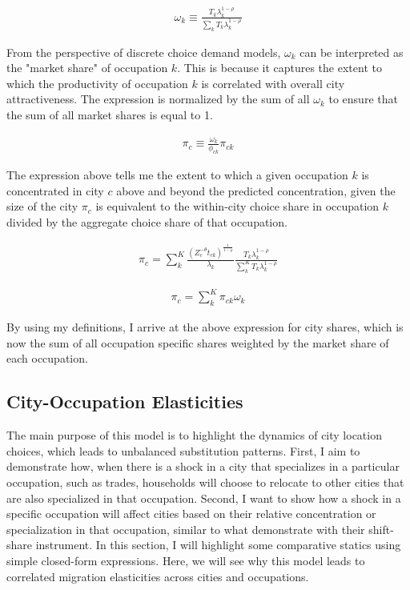 \documentclass[10pt]{article}
\begin{document}
\begin{align}
    \omega_k \equiv \frac{{T_{k}}\lambda_{k}^{1-\rho}}{\sum\limits_{k}{T_{k}}\lambda_{k}^{1-\rho}}
    \label{occupation_shares}
\end{align}

From the perspective of discrete choice demand models, $\omega_k$ can be interpreted as the "market share" of occupation $k$. This is because it captures the extent to which the productivity of occupation $k$ is correlated with overall city attractiveness. The expression is normalized by the sum of all $\omega_k$ to ensure that the sum of all market shares is equal to 1.

\begin{align}
    \pi_c \equiv \frac{\omega_k}{\phi_{ck}} \pi_{ck}
    \label{identity}
\end{align}

The expression above tells me the extent to which a given occupation $k$ is concentrated in city $c$ above and beyond the predicted concentration, given the size of the city $\pi_c$ is equivalent to the within-city choice share in occupation $k$ divided by the aggregate choice share of that occupation.

\begin{align*}
    \pi_{c} = \sum_{k}^{K} \frac{(Z_{c}^{-\theta} t_{ck})^{\frac{1}{1-\rho}}}{\lambda_k} \frac{T_k \lambda_{k}^{1 - \rho}}{\sum \limits_{k}^{K} T_k \lambda_{k}^{1-\rho}}
\end{align*}

\begin{align}
    \pi_c = \sum_{k}^{K} \pi_{ck} \omega_k
\end{align}

By using my definitions, I arrive at the above expression for city shares, which is now the sum of all occupation specific shares weighted by the market share of each occupation.

\subsection{City-Occupation Elasticities}

The main purpose of this model is to highlight the dynamics of city location choices, which leads to unbalanced substitution patterns. First, I aim to demonstrate how, when there is a shock in a city that specializes in a particular occupation, such as trades, households will choose to relocate to other cities that are also specialized in that occupation. Second, I want to show how a shock in a specific occupation will affect cities based on their relative concentration or specialization in that occupation, similar to what \cite{adh2013} demonstrate with their shift-share instrument. In this section, I will highlight some comparative statics using simple closed-form expressions. Here, we will see why this model leads to correlated migration elasticities across cities and occupations.
\end{document}
